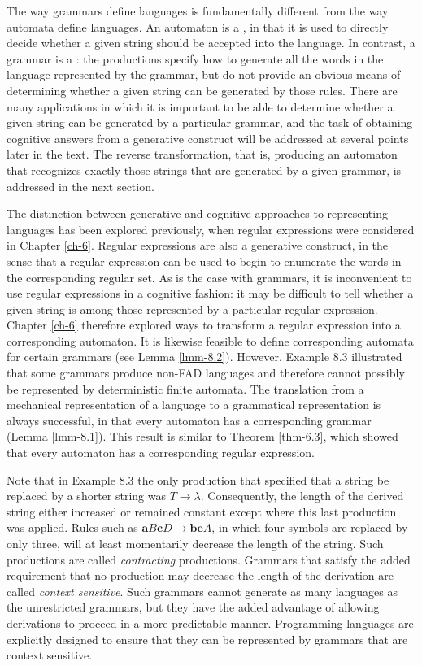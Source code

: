 The way grammars define languages is fundamentally different from the way
automata define languages. An automaton is a \emph{}, in that it
is used to directly decide whether a given string should be accepted into the
language. In contrast, a grammar is a \emph{}: the
productions specify how to generate all the words in the language represented by
the grammar, but do not provide an obvious means of determining whether a given
string can be generated by those rules. There are many applications in which it
is important to be able to determine whether a given string can be generated by
a particular grammar, and the task of obtaining cognitive answers from a
generative construct will be addressed at several points later in the text. The
reverse transformation, that is, producing an automaton that recognizes exactly
those strings that are generated by a given grammar, is addressed in the next
section.

The distinction between generative and cognitive approaches to representing
languages has been explored previously, when regular expressions were considered
in Chapter \ref{ch-6}. Regular expressions are also a generative construct, in the sense
that a regular expression can be used to begin to enumerate the words in the
corresponding regular set. As is the case with grammars, it is inconvenient to
use regular expressions in a cognitive fashion: it may be difficult to tell
whether a given string is among those represented by a particular regular
expression. Chapter \ref{ch-6} therefore explored ways to transform a regular expression
into a corresponding automaton. It is likewise feasible to define corresponding
automata for certain grammars (see Lemma \ref{lmm-8.2}). However, Example 8.3 illustrated
that some grammars produce non-FAD languages and therefore cannot possibly be
represented by deterministic finite automata. The translation from a mechanical
representation of a language to a grammatical representation is always
successful, in that every automaton has a corresponding grammar (Lemma \ref{lmm-8.1}).
This result is similar to Theorem \ref{thm-6.3}, which showed that every automaton has a
corresponding regular expression.

Note that in Example 8.3 the only production that specified that a string be
replaced by a shorter string was $T \rightarrow \lambda$. Consequently, the
length of the derived string either increased or remained constant except where
this last production was applied. Rules such as $\pmb{a}B\pmb{c}D \rightarrow
\pmb{be}A$, in which four symbols are replaced by only three, will at least
momentarily decrease the length of the string. Such productions are called
\emph{contracting} productions. Grammars that satisfy the added requirement that
no production may decrease the length of the derivation are called
\emph{context sensitive}. Such grammars cannot generate as many
languages as the unrestricted grammars, but they have the added advantage of
allowing derivations to proceed in a more predictable manner. Programming
languages are explicitly designed to ensure that they can be represented by
grammars that are context sensitive.

